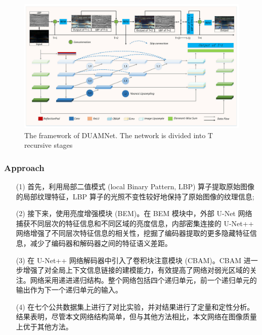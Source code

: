 \documentclass[a4paper]{ctexart}
\begin{document}
	\begin{figure}[htbp]
		\centering 
		\includegraphics[width=\columnwidth]{picture/LLIE/Dual UNet/DUAMNet framework}
		\caption{
			\label{fig: DUAMNet framework} 
			The framework of DUAMNet. The network is divided into T recursive stages
		}
	\end{figure}
	
	\subsubsection{Approach}
	
	\begin{itemize}
		\item[(1)] 
		首先，利用局部二值模式 (local Binary Pattern, LBP) 算子提取原始图像的局部纹理特征，LBP 算子的光照不变性较好地保持了原始图像的纹理信息;
		
		\item[(2)]
		接下来，使用亮度增强模块 (BEM)。在 BEM 模块中，外部 U-Net 网络捕获不同层次的特征信息和不同区域的亮度信息，内部密集连接的 U-Net++ 网络增强了不同层次特征信息的相关性，挖掘了编码器提取的更多隐藏特征信息，减少了编码器和解码器之间的特征语义差距。
		
		\item[(3)]
		在 U-Net++ 网络解码器中引入了卷积块注意模块 (CBAM)。CBAM 进一步增强了对全局上下文信息链接的建模能力，有效提高了网络对弱光区域的关注。网络采用递进递归结构。整个网络包括四个递归单元，前一个递归单元的输出作为下一个递归单元的输入。
		
		\item[(4)]
		在七个公共数据集上进行了对比实验，并对结果进行了定量和定性分析。结果表明，尽管本文网络结构简单，但与其他方法相比，本文网络在图像质量上优于其他方法。
		
	\end{itemize}	
	
\end{document}
